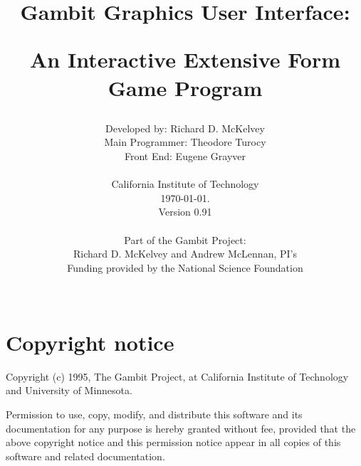%
%
%
%

\parskip=10pt%
\parindent=0pt%
\itemsep{0pt}
\title{Gambit Graphics User Interface:\\
\centerline{An Interactive Extensive Form Game Program}}
\author{Developed by: Richard D. McKelvey\\
Main Programmer: Theodore Turocy\\
Front End: Eugene Grayver\\
 \\
California Institute of Technology\\ \today.\\
Version 0.91\\
 \\
Part of the Gambit Project:\\
Richard D. McKelvey and Andrew McLennan, PI's\\
Funding provided by the National Science Foundation\\
 \\}

\makeindex%
%
\maketitle%


\tableofcontents%

\chapter*{Copyright notice}%

Copyright (c) 1995, The Gambit Project, at California Institute of
Technology and University of Minnesota.  

Permission to use, copy, modify, and distribute this software and its
documentation for any purpose is hereby granted without fee, provided that the
above copyright notice and this permission notice appear in
all copies of this software and related documentation.


